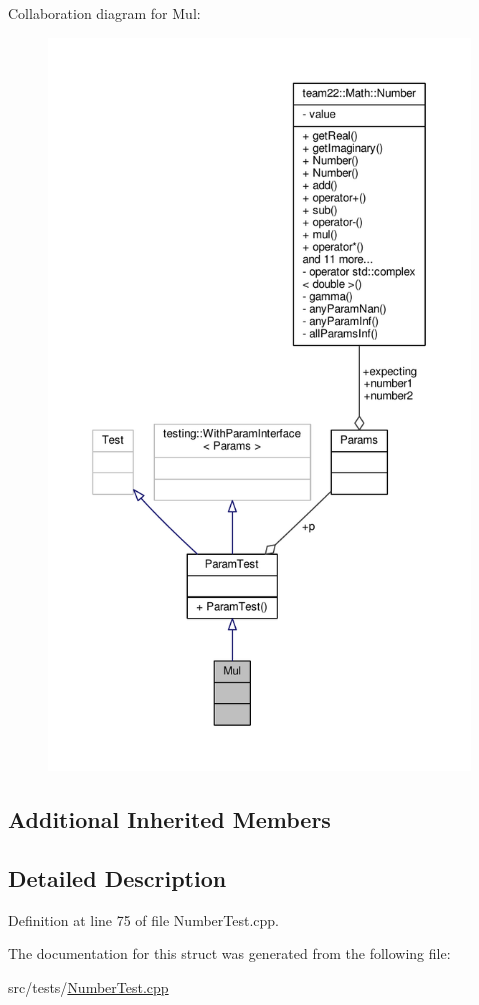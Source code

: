 Collaboration diagram for Mul\+:
\nopagebreak
\begin{figure}[H]
\begin{center}
\leavevmode
\includegraphics[height=550pt]{struct_mul__coll__graph}
\end{center}
\end{figure}
\subsection*{Additional Inherited Members}


\subsection{Detailed Description}


Definition at line 75 of file Number\+Test.\+cpp.



The documentation for this struct was generated from the following file\+:\begin{DoxyCompactItemize}
\item 
src/tests/\hyperlink{_number_test_8cpp}{Number\+Test.\+cpp}\end{DoxyCompactItemize}
